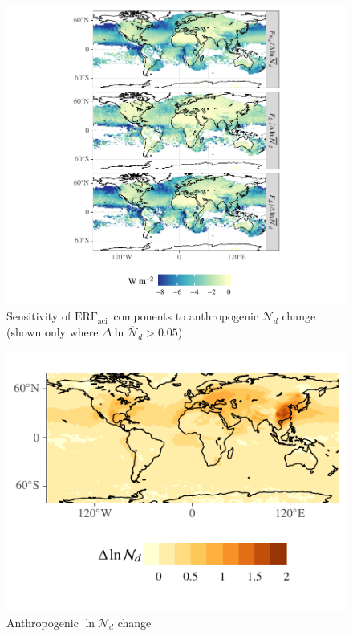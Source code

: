 \documentclass[acp, manuscript]{copernicus}\usepackage[]{graphicx}\usepackage[]{color}
\newcommand\erfaci{\ensuremath{\text{ERF}_\text{aci}}}
\begin{document}
\clearpage

\begin{figure}[t]
  \centering



{\centering \includegraphics[width=\textwidth]{figure/erf-prp-erf-susc-1} 

}



  \caption{Sensitivity of \erfaci\ components to anthropogenic $\mathcal{N}_d$
    change (shown only where $\Delta\ln\overline{\mathcal{N}}_d > 0.05$)}
  \label{fig:sens}
\end{figure}

\clearpage

\begin{figure}[t]
  \centering



{\centering \includegraphics[width=0.5\linewidth]{figure/erf-prp-delta-ln-nd-filled-contour-1} 

}



  \caption{Anthropogenic $\ln\mathcal{N}_d$ change}
  \label{fig:deltand-filledcontour}
\end{figure}
\end{document}
